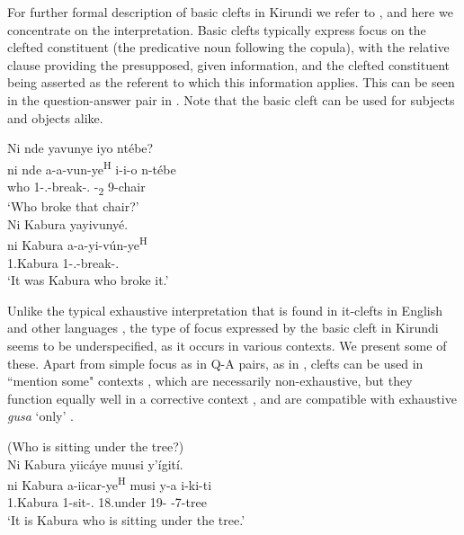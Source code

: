 \documentclass[output=paper]{langscibook}
\begin{document}
For further formal description of basic clefts in Kirundi we refer to \citet{LafkiouiEtAl2016}, and here we concentrate on the interpretation. Basic clefts typically express focus on the clefted constituent (the predicative noun following the copula), with the relative clause providing the presupposed, given information, and the clefted constituent being asserted as the referent to which this information applies. This can be seen in the question-answer pair in . Note that the basic cleft can be used for subjects and objects alike.

\ea
\label{bkm:Ref76915336}
\begin{xlist}
Ni nde yavunye iyo ntébe?\\
\gll
ni  nde  a-a-vun-ye\textsuperscript{H}  i-i-o  n-tébe\\
\COP{}  who  1\SM-\N.\PST{}-break-\PFV.\REL{}  -\DEM{}\textsubscript{2}  9-chair\\
\glt
‘Who broke that chair?’\\

Ni Kabura yayivunyé.\\
\gll
ni  Kabura  a-a-yi-vún-ye\textsuperscript{H}\\
\COP{}  1.Kabura  1\SM-\N.\OM{}-break-\PFV.\REL{}\\
\glt
‘It was Kabura who broke it.’\\

\end{xlist}
\z

Unlike the typical exhaustive interpretation that is found in it-clefts in English and other languages \citep[e.g.][]{Horn1981,É.Kiss1998,Declerck1988,Hedberg2000,BeaverClark2008}, the type of focus expressed by the basic cleft in Kirundi seems to be underspecified, as it occurs in various contexts. We present some of these. Apart from simple focus as in Q-A pairs, as in , clefts can be used in ``mention some" contexts , which are necessarily non-exhaustive, but they function equally well in a corrective context , and are compatible with exhaustive \textit{gusa} ‘only’ . 

\ea
\label{bkm:Ref142572186}
(Who is sitting under the tree?)\\
Ni Kabura yiicáye muusi y’ígití.\\
\gll
ni  Kabura  a-iicar-ye\textsuperscript{H}  musi  y-a  i-ki-ti\\
\COP{}  1.Kabura  1\SM{}-sit-\PFV.\REL{}  18.under  19-\CONN{}  \AUG{}-7-tree\\
\glt
‘It is Kabura who is sitting under the tree.’\\
\end{document}

